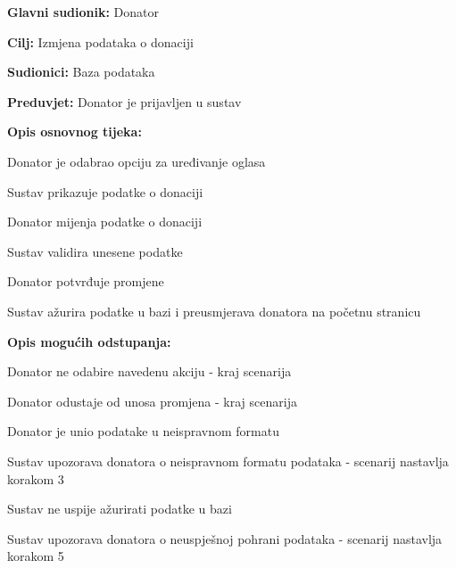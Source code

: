 					\noindent {}
					\begin{packed_item}
	
						\item \textbf{Glavni sudionik: }Donator
						\item  \textbf{Cilj:} Izmjena podataka o donaciji
						\item  \textbf{Sudionici:} Baza podataka
						\item  \textbf{Preduvjet:} Donator je prijavljen u sustav
						\item  \textbf{Opis osnovnog tijeka:}
						
						\item[] \begin{packed_enum}
							\item Donator je odabrao opciju za uređivanje oglasa
							\item Sustav prikazuje podatke o donaciji
							\item Donator mijenja podatke o donaciji
							\item Sustav validira unesene podatke
							\item Donator potvrđuje promjene
							\item Sustav ažurira podatke u bazi i preusmjerava donatora na početnu stranicu
						\end{packed_enum}

						\eject

						\item  \textbf{Opis mogućih odstupanja:}

						\item[] \begin{packed_item}
							\item[1.a] Donator ne odabire navedenu akciju - kraj scenarija
							\item[3.a] Donator odustaje od unosa promjena - kraj scenarija
							\item[4.a] Donator je unio podatake u neispravnom formatu
							\item[] \begin{packed_enum}
								\item Sustav upozorava donatora o neispravnom formatu podataka - scenarij nastavlja korakom 3
							\end{packed_enum}	
							\item[6.a] Sustav ne uspije ažurirati podatke u bazi
							\item[] \begin{packed_enum}
								\item Sustav upozorava donatora o neuspješnoj pohrani podataka - scenarij nastavlja korakom 5 
							\end{packed_enum}					
						\end{packed_item}
					\end{packed_item}

